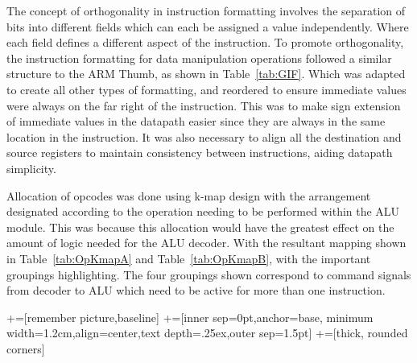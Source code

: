 The concept of orthogonality in instruction formatting involves the separation of bits into different fields which can each be assigned a value independently. 
Where each field defines a different aspect of the instruction. 
To promote orthogonality, the instruction formatting for data manipulation operations followed a similar structure to the ARM Thumb, as shown in Table~\ref{tab:GIF}. 
Which was adapted to create all other types of formatting, and reordered to ensure immediate values were always on the far right of the instruction. 
This was to make sign extension of immediate values in the datapath easier since they are always in the same location in the instruction. 
It was also necessary to align all the destination and source registers to maintain consistency between instructions, aiding datapath simplicity. 

Allocation of opcodes was done using k-map design with the arrangement designated according to the operation needing to be performed within the ALU module. 
This was because this allocation would have the greatest effect on the amount of logic needed for the ALU decoder. 
With the resultant mapping shown in Table~\ref{tab:OpKmapA} and Table~\ref{tab:OpKmapB}, with the important groupings highlighting. 
The four groupings shown correspond to command signals from decoder to ALU which need to be active for more than one instruction. 


\newcommand\tabnode[1]{\addtocounter{nodecount}{1} \tikz \node (\arabic{nodecount}) {#1};}

+=[remember picture,baseline]
+=[inner sep=0pt,anchor=base,
minimum width=1.2cm,align=center,text depth=.25ex,outer sep=1.5pt]
+=[thick, rounded corners]

\newcommand{\darkercolor}[3]{%
    \colorlet{#3}{#1!#2!black}
}
\darkercolor{green}{60}{darkgreen}

